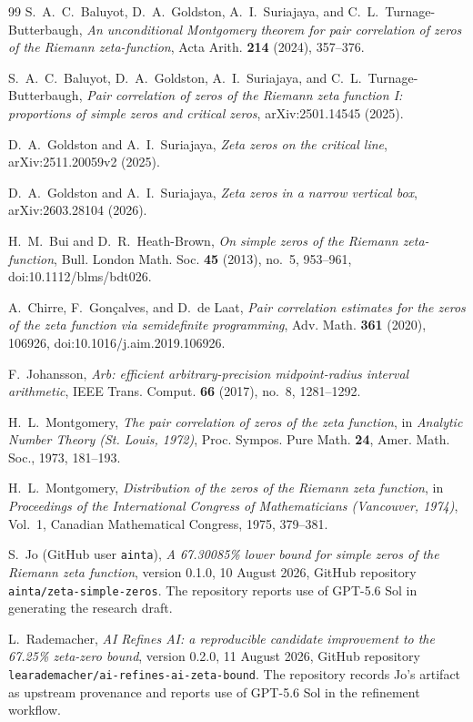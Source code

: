 \documentclass[11pt]{article}
\begin{document}
\begin{thebibliography}{99}
S.~A.~C.~Baluyot, D.~A.~Goldston, A.~I.~Suriajaya, and
C.~L.~Turnage-Butterbaugh,
\emph{An unconditional Montgomery theorem for pair correlation of zeros of
the Riemann zeta-function},
Acta Arith. \textbf{214} (2024), 357--376.

S.~A.~C.~Baluyot, D.~A.~Goldston, A.~I.~Suriajaya, and
C.~L.~Turnage-Butterbaugh,
\emph{Pair correlation of zeros of the Riemann zeta function I: proportions
of simple zeros and critical zeros},
arXiv:2501.14545 (2025).

D.~A.~Goldston and A.~I.~Suriajaya,
\emph{Zeta zeros on the critical line},
arXiv:2511.20059v2 (2025).

D.~A.~Goldston and A.~I.~Suriajaya,
\emph{Zeta zeros in a narrow vertical box},
arXiv:2603.28104 (2026).

H.~M.~Bui and D.~R.~Heath-Brown,
\emph{On simple zeros of the Riemann zeta-function},
Bull. London Math. Soc. \textbf{45} (2013), no.~5, 953--961,
doi:10.1112/blms/bdt026.

A.~Chirre, F.~Gon\c{c}alves, and D.~de Laat,
\emph{Pair correlation estimates for the zeros of the zeta function via
semidefinite programming},
Adv. Math. \textbf{361} (2020), 106926,
doi:10.1016/j.aim.2019.106926.

F.~Johansson,
\emph{Arb: efficient arbitrary-precision midpoint-radius interval arithmetic},
IEEE Trans. Comput. \textbf{66} (2017), no.~8, 1281--1292.

H.~L.~Montgomery,
\emph{The pair correlation of zeros of the zeta function},
in \emph{Analytic Number Theory (St. Louis, 1972)},
Proc. Sympos. Pure Math. \textbf{24}, Amer. Math. Soc., 1973, 181--193.

H.~L.~Montgomery,
\emph{Distribution of the zeros of the Riemann zeta function},
in \emph{Proceedings of the International Congress of Mathematicians
(Vancouver, 1974)}, Vol.~1, Canadian Mathematical Congress, 1975, 379--381.


S.~Jo (GitHub user \texttt{ainta}),
\emph{A 67.30085\% lower bound for simple zeros of the Riemann zeta
function},
version 0.1.0, 10 August 2026,
GitHub repository \texttt{ainta/zeta-simple-zeros}.
The repository reports use of GPT-5.6 Sol in generating the research draft.

L.~Rademacher,
\emph{AI Refines AI: a reproducible candidate improvement to the 67.25\%
zeta-zero bound},
version 0.2.0, 11 August 2026,
GitHub repository \texttt{learademacher/ai-refines-ai-zeta-bound}.
The repository records Jo's artifact as upstream provenance and reports use
of GPT-5.6 Sol in the refinement workflow.



\end{thebibliography}
\end{document}
